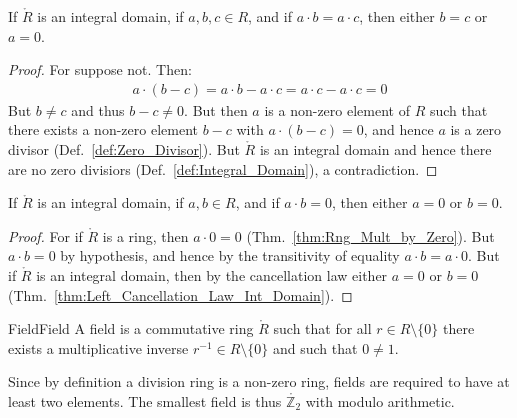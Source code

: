 \documentclass{article}                                                        %
\begin{document}
        \begin{theorem}
            \label{thm:Left_Cancellation_Law_Int_Domain}%
            If $\ring{R}$ is an integral domain, if $a,b,c\in{R}$, and if
            $a\cdot{b}=a\cdot{c}$, then either $b=c$ or $a=0$.
        \end{theorem}
        \begin{proof}
            For suppose not. Then:
            \begin{align}
                a\cdot(b-c)=a\cdot{b}-a\cdot{c}=a\cdot{c}-a\cdot{c}=0
            \end{align}
            But $b\ne{c}$ and thus $b-c\ne{0}$. But then $a$ is a non-zero
            element of $R$ such that there exists a non-zero element $b-c$ with
            $a\cdot(b-c)=0$, and hence $a$ is a zero divisor
            (Def.~\ref{def:Zero_Divisor}). But $\ring{R}$ is an integral domain
            and hence there are no zero divisiors
            (Def.~\ref{def:Integral_Domain}), a contradiction.
        \end{proof}
        \begin{theorem}
            \label{thm:Int_Domain_AB_EQ_Zero_A_or_B_EQ_Zero}%
            If $\ring{R}$ is an integral domain, if $a,b\in{R}$, and if
            $a\cdot{b}=0$, then either $a=0$ or $b=0$.
        \end{theorem}
        \begin{proof}
            For if $\ring{R}$ is a ring, then $a\cdot{0}=0$
            (Thm.~\ref{thm:Rng_Mult_by_Zero}). But $a\cdot{b}=0$ by hypothesis,
            and hence by the transitivity of equality $a\cdot{b}=a\cdot{0}$.
            But if $\ring{R}$ is an integral domain, then by the cancellation
            law either $a=0$ or $b=0$
            (Thm.~\ref{thm:Left_Cancellation_Law_Int_Domain}).
        \end{proof}
        \begin{fdefinition}{Field}{Field}
            A field is a commutative ring $\ring{R}$ such that for all
            $r\in{R}\setminus\{0\}$ there exists a multiplicative inverse
            $r^{\minus{1}}\in{R}\setminus\{0\}$ and such that $0\ne{1}$.
        \end{fdefinition}
        \begin{example}
            Since by definition a division ring is a non-zero ring, fields are
            required to have at least two elements. The smallest field is thus
            $\ring{\mathbb{Z}_{2}}$ with modulo arithmetic.
        \end{example}
\end{document}

